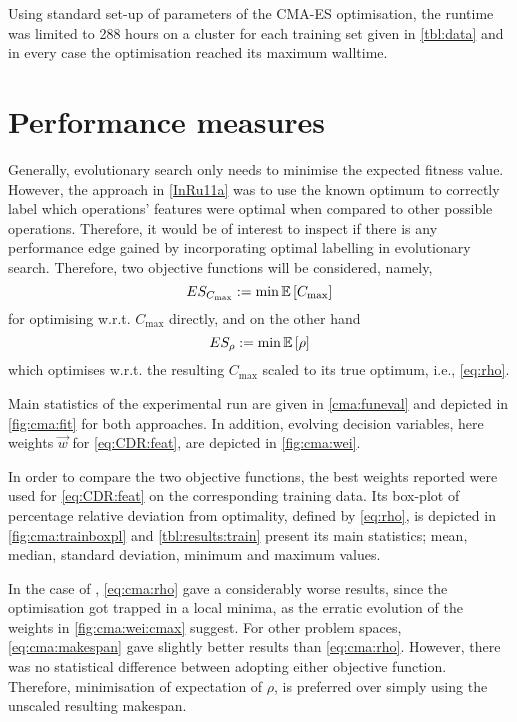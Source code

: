 Using standard set-up of parameters of the CMA-ES optimisation, the runtime was 
limited to 288 hours on a cluster for each training set given in 
\cref{tbl:data} and in every case the optimisation reached its maximum walltime.

\section{Performance measures}\label{sec:expr:measure}
Generally, evolutionary search only needs to minimise the expected fitness 
value. However, the  approach in \cref{InRu11a} was to use the known optimum to 
correctly label which operations' features were optimal when compared to other 
possible operations. Therefore, it would be of interest to inspect if there is 
any performance edge gained by incorporating optimal labelling in evolutionary 
search. Therefore, two objective functions will be considered, namely, 
\begin{equation}\label{eq:cma:makespan}
	ES_{C_{\max}} := \min \Exp{C_{\max}} 
\end{equation}
for optimising w.r.t. $C_{\max}$ directly, and on the other hand
\begin{equation}\label{eq:cma:rho}
	ES_{\rho} := \min \Exp{\rho} 
\end{equation} 
which optimises w.r.t. the resulting $C_{\max}$ scaled to its true optimum, 
i.e., \cref{eq:rho}.

Main statistics of the experimental run are given in \cref{cma:funeval} and 
depicted in \cref{fig:cma:fit} for both approaches. In addition, evolving 
decision variables, here weights $\vec{w}$ for \cref{eq:CDR:feat}, are 
depicted in \cref{fig:cma:wei}. 

In order to compare the two objective functions, the best weights reported were 
used for \cref{eq:CDR:feat} on the corresponding training data. Its 
box-plot of percentage relative deviation from optimality, defined by 
\cref{eq:rho}, is depicted in \cref{fig:cma:trainboxpl} and 
\cref{tbl:results:train} present its main statistics; mean, median, standard 
deviation, minimum and maximum values.

In the case of , \cref{eq:cma:rho} gave a considerably worse 
results, since the optimisation got trapped in a local minima, as the erratic 
evolution of the weights in \cref{fig:cma:wei:cmax} suggest.
For other problem spaces, \cref{eq:cma:makespan} gave slightly better results 
than \cref{eq:cma:rho}. However, there was no statistical difference between 
adopting either objective function. Therefore, minimisation of expectation of 
$\rho$, is preferred over simply using the unscaled resulting makespan. 

